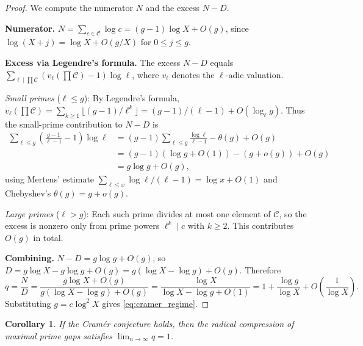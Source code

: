 \documentclass[11pt, a4paper]{article}
\newtheorem{corollary}[theorem]{Corollary}
\theoremstyle{definition}
\theoremstyle{remark}
\begin{document}
\begin{proof}
We compute the numerator $N$ and the excess $N - D$.

\textbf{Numerator.}
$N = \sum_{c \in \mathcal{C}} \log c
= (g-1)\log X + O(g)$,
since $\log(X + j) = \log X + O(g/X)$ for $0 \le j \le g$.

\textbf{Excess via Legendre's formula.}
The excess $N - D$ equals
$\sum_{\ell \mid \prod \mathcal{C}}
(v_\ell(\prod \mathcal{C}) - 1) \log \ell$,
where $v_\ell$ denotes the $\ell$-adic valuation.

\emph{Small primes} ($\ell \le g$):
By Legendre's formula,
$v_\ell(\prod \mathcal{C})
= \sum_{k \ge 1} \lfloor(g-1)/\ell^k\rfloor
= (g-1)/(\ell - 1) + O(\log_\ell g)$.
Thus the small-prime contribution to $N - D$ is
\begin{align*}
    \sum_{\ell \le g}
    \left(\frac{g-1}{\ell - 1} - 1\right) \log \ell
    &= (g-1)\sum_{\ell \le g} \frac{\log \ell}{\ell - 1}
       - \theta(g) + O(g) \\
    &= (g-1)(\log g + O(1)) - (g + o(g)) + O(g) \\
    &= g\log g + O(g),
\end{align*}
using Mertens' estimate
$\sum_{\ell \le x} \log \ell / (\ell - 1) = \log x + O(1)$
and Chebyshev's $\theta(g) = g + o(g)$.

\emph{Large primes} ($\ell > g$):
Each such prime divides at most one element of $\mathcal{C}$,
so the excess is nonzero only from prime powers
$\ell^k \mid c$ with $k \ge 2$.
This contributes $O(g)$ in total.

\textbf{Combining.}
$N - D = g\log g + O(g)$, so
$D = g\log X - g\log g + O(g) = g(\log X - \log g) + O(g)$.
Therefore
\[
    q = \frac{N}{D}
    = \frac{g\log X + O(g)}{g(\log X - \log g) + O(g)}
    = \frac{\log X}{\log X - \log g + O(1)}
    = 1 + \frac{\log g}{\log X}
      + O\!\left(\frac{1}{\log X}\right).
\]
Substituting $g = c\log^2 X$ gives \eqref{eq:cramer_regime}.
\end{proof}

\begin{corollary}\label{cor:limit}
If the Cram\'er conjecture holds, then the radical
compression of maximal prime gaps satisfies
$\lim_{n\to\infty} q = 1$.
\end{corollary}
\end{document}
